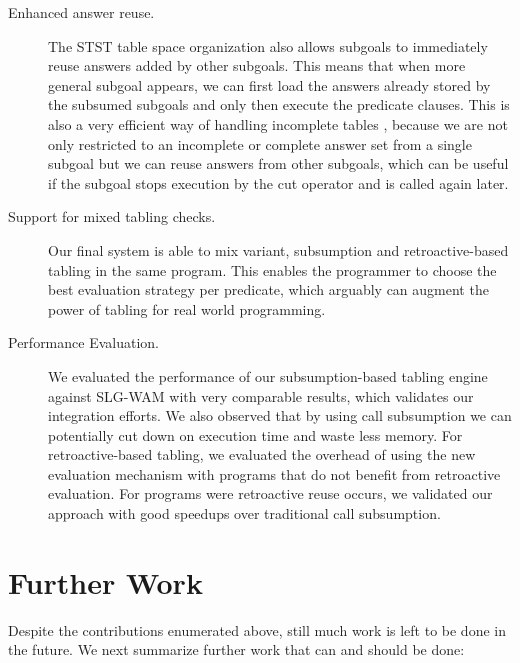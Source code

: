 \begin{description}
   \item[Enhanced answer reuse.] The STST table space organization also allows subgoals to immediately reuse answers
   added by other subgoals. This means that when more general subgoal appears, we can first load the answers already
   stored by the subsumed subgoals and only then execute the predicate clauses. This is also a very efficient way of
   handling incomplete tables \cite{Rocha-07a}, because we are not only restricted to an incomplete or complete answer
   set from a single subgoal but we can reuse answers from other subgoals, which can be useful if the subgoal stops
   execution by the cut operator and is called again later.
   
   \item[Support for mixed tabling checks.] Our final system is able to mix variant, subsumption and retroactive-based
   tabling in the same program. This enables the programmer to choose the best evaluation strategy per predicate,
   which arguably can augment the power of tabling for real world programming.
   
   \item[Performance Evaluation.] We evaluated the performance of our subsumption-based tabling engine
   against SLG-WAM with very comparable results, which validates our integration efforts. We also observed
   that by using call subsumption we can potentially cut down on execution time and waste less memory.
   For retroactive-based tabling, we evaluated the overhead of using the new evaluation mechanism with programs that do
   not benefit from retroactive evaluation. For programs were retroactive reuse occurs, we validated our
   approach with good speedups over traditional call subsumption.
   
\end{description}


\section{Further Work}

Despite the contributions enumerated above, still much work is left to be done in the future.
We next summarize further work that can and should be done:

